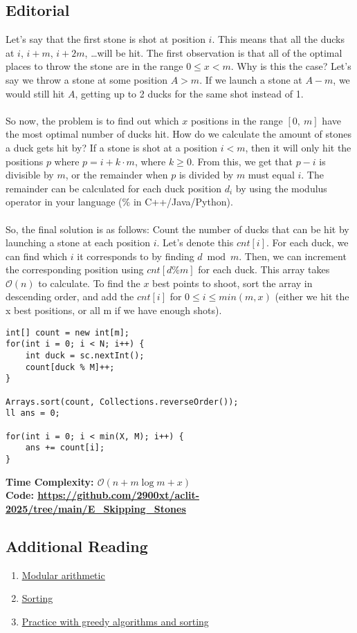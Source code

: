 \documentclass{article}
\newcommand{\link}[1]{\textcolor{blue!50!black}{\uline{\url{#1}}}}
\newcommand{\namelink}[2]{\textcolor{blue!50!black}{\uline{\href{#1}{#2}}}}
\begin{document}
\subsection{Editorial}
Let's say that the first stone is shot at position $i$. This means that all the ducks at $i$, $i+m$, $i+2m$, \dots will be hit. The first observation is that all of the optimal places to throw the stone are in the range $0 \leq x < m$. Why is this the case? Let's say we throw a stone at some position $A > m$. If we launch a stone at $A - m$, we would still hit $A$, getting up to 2 ducks for the same shot instead of 1.
\\\\
So now, the problem is to find out which $x$ positions in the range $[0,\ m]$ have the most optimal number of ducks hit. How do we calculate the amount of stones a duck gets hit by? If a stone is shot at a position $i < m$, then it will only hit the positions $p$ where $p = i +k\cdot m$, where $k\geq 0$. From this, we get that $p-i$ is divisible by $m$, or the remainder when $p$ is divided by $m$ must equal $i$. The remainder can be calculated for each duck position $d_i$ by using the modulus operator in your language ($\%$ in C++/Java/Python). 
\\\\
So, the final solution is as follows: Count the number of ducks that can be hit by launching a stone at each position $i$. Let's denote this $cnt[i]$. For each duck, we can find which $i$ it corresponds to by finding $d\bmod m$. Then, we can increment the corresponding position using $cnt[d \% m]$ for each duck. This array takes $\mathcal{O}(n)$ to calculate. To find the $x$ best points to shoot, sort the array in descending order, and add the $cnt[i]$ for $0\leq i\leq min(m, x)$ (either we hit the x best positions, or all m if we have enough shots).
\begin{lstlisting}
int[] count = new int[m];
for(int i = 0; i < N; i++) {
    int duck = sc.nextInt();
    count[duck % M]++;
}

Arrays.sort(count, Collections.reverseOrder());
ll ans = 0;

for(int i = 0; i < min(X, M); i++) {
    ans += count[i];
}
\end{lstlisting}
\textbf{Time Complexity: $\mathcal{O}(n+m\log m+x)$}\\
\textbf{Code: \link{https://github.com/2900xt/aclit-2025/tree/main/E_Skipping_Stones}}
\subsection{Additional Reading}
\begin{enumerate}
    \item \namelink{https://www.khanacademy.org/computing/computer-science/cryptography/modarithmetic/a/what-is-modular-arithmetic}{Modular arithmetic}
    \item \namelink{https://www.geeksforgeeks.org/introduction-to-sorting-algorithm/}{Sorting}
    \item \namelink{https://usaco.guide/silver/greedy-sorting}{Practice with greedy algorithms and sorting}
\end{enumerate}
\newpage
\end{document}
